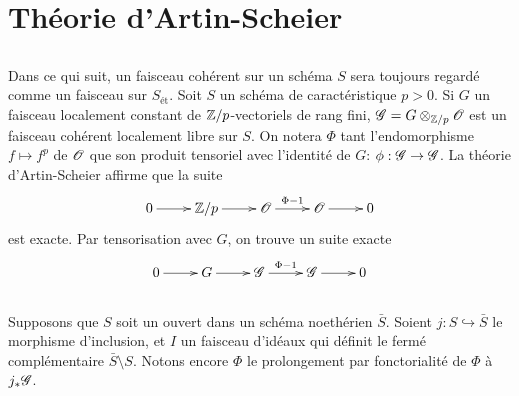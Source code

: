 \section{Théorie d'Artin-Scheier}\label{III:3}





\subsection{}\label{III:3-1}

Dans ce qui suit, un faisceau cohérent sur un schéma $S$ sera toujours 
regardé comme un faisceau sur $S_\text{ét}$. Soit $S$ un schéma de 
caractéristique $p>0$. Si $G$ un faisceau localement constant de 
$\mathbb{Z}/p$-vectoriels de rang fini, $\mathscr{G}=G\otimes_{\mathbb{Z}/p}\mathscr{O}$ est un faisceau 
cohérent localement libre sur $S$. On notera $\Phi$ tant l'endomorphisme 
$f\mapsto f^p$ de $\mathscr{O}$ que son produit tensoriel avec l'identité de 
$G$: $\phi:\mathscr{G}\to\mathscr{G}$. La théorie d'Artin-Scheier \cite[IX 3.5]{sga4} 
affirme que la suite 
\[\xymatrix{
  0 \ar[r] 
    & \dZ/p \ar[r] 
    & \cO \ar[r]^-{\Phi-1} 
    & \cO \ar[r] 
    & 0
}\]
est exacte. Par tensorisation avec $G$, on trouve un suite exacte 
\[\xymatrix{
  0 \ar[r] 
    & G \ar[r] 
    & \cG \ar[r]^-{\Phi-1} 
    & \cG \ar[r] 
    & 0
}\]





\subsection{}\label{III:3-2}

Supposons que $S$ soit un ouvert dans un schéma noethérien $\bar S$. 
Soient $j:S\hookrightarrow \bar S$ le morphisme d'inclusion, et $I$ un 
faisceau d'idéaux qui définit le fermé complémentaire 
$\bar S\setminus S$. Notons encore $\Phi$ le prolongement par fonctorialité 
de $\Phi$ à $j_*\mathscr{G}$. 





